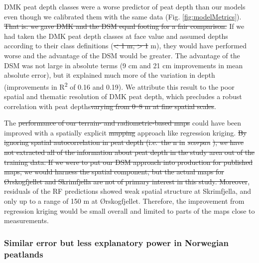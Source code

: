 \documentclass[soil, manuscript]{copernicus}
\providecommand{\DIFadd}[1]{{\protect\color{blue}\uwave{#1}}} %
\providecommand{\DIFdel}[1]{{\protect\color{red}\sout{#1}}}                      %
\providecommand{\DIFaddbegin}{} %
\providecommand{\DIFaddend}{} %
\providecommand{\DIFdelbegin}{} %
\providecommand{\DIFdelend}{} %
\begin{document}
DMK peat depth classes were a worse predictor of peat depth than our models even though we calibrated them with the same data (Fig. \ref{fig:modelMetrics}).
\DIFdelbegin \DIFdel{That is: we gave DMK and the DSM equal footing for a fair comparison.
}\DIFdelend If we had taken the DMK peat depth classes at face value and assumed depths according to their class definitions (\DIFdelbegin \DIFdel{\textless{} 1 m, \textgreater{} 1 }\DIFdelend \DIFaddbegin \DIFadd{\textless1 m, \textgreater1 }\DIFaddend m), they would have performed worse and the advantage of the DSM would be greater.
The advantage of the DSM was not large in absolute terms (9 cm and 21 cm improvements in mean absolute error), but it explained much more of the variation in depth (improvements in R\textsuperscript{2} of 0.16 and 0.19).
We attribute this result to the poor spatial and thematic resolution of DMK peat depth, which precludes a robust correlation with peat depths\DIFdelbegin \DIFdel{varying from 0--8 m at fine spatial scales}\DIFdelend .

The \DIFdelbegin \DIFdel{performance of our terrain- and radiometric-based maps }\DIFdelend \DIFaddbegin \DIFadd{accuracy of our mapping }\DIFaddend could have been improved with a spatially explicit \DIFdelbegin \DIFdel{mapping }\DIFdelend approach like regression kriging.
\DIFdelbegin \DIFdel{By ignoring spatial autocorrelation in peat depth (i.e.~the n in }\emph{\DIFdel{scorpan}}%
\DIFdel{), we have not extracted all of the information about peat depth in the study area out of the training data.
If we were to put our DSM approach into production for published maps, we would harness the spatial component, but the actual maps for Ørskogfjellet and Skrimfjella are not of primary interest in this study.
Moreover}\DIFdelend \DIFaddbegin \DIFadd{However}\DIFaddend , residuals of the RF predictions showed weak spatial structure at Skrimfjella, and only up to a range of 150 m at Ørskogfjellet.
Therefore, the improvement from regression kriging would be small overall and limited to parts of the maps close to measurements.

\subsubsection{Similar error but less explanatory power in Norwegian peatlands}
\end{document}
